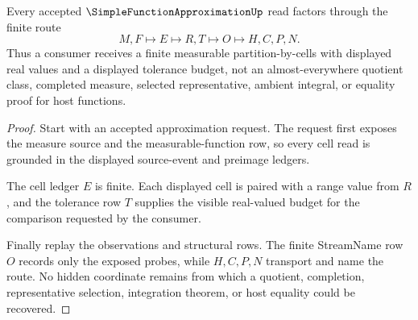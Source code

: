 \begin{theorem}
\label{thm:simple-function-approximation-finite-cell-route}
Every accepted $\SimpleFunctionApproximationUp$ read factors through the finite route
$$
M,F \longmapsto E \longmapsto R,T \longmapsto O \longmapsto H,C,P,N .
$$
Thus a consumer receives a finite measurable partition-by-cells with displayed real values and a displayed tolerance budget, not an almost-everywhere quotient class, completed measure, selected representative, ambient integral, or equality proof for host functions.
\end{theorem}
\begin{proof}
Start with an accepted approximation request. The request first exposes the measure source and the measurable-function row, so every cell read is grounded in the displayed source-event and preimage ledgers.

The cell ledger $E$ is finite. Each displayed cell is paired with a range value from $R$, and the tolerance row $T$ supplies the visible real-valued budget for the comparison requested by the consumer.

Finally replay the observations and structural rows. The finite StreamName row $O$ records only the exposed probes, while $H,C,P,N$ transport and name the route. No hidden coordinate remains from which a quotient, completion, representative selection, integration theorem, or host equality could be recovered.
\end{proof}




